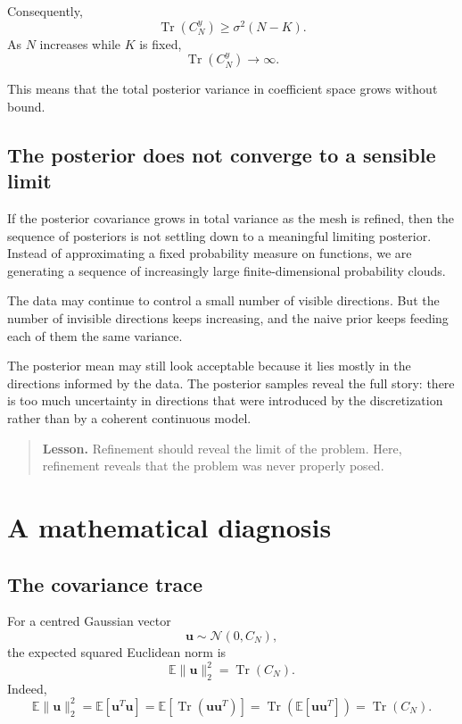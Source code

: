 \documentclass[11pt,a4paper]{book}
\newenvironment{lesson}
  {\begin{quote}\textbf{Lesson.}}
  {\end{quote}}
\begin{document}
Consequently,
\[
    \operatorname{Tr}(C_N^y)
    \geq
    \sigma^2 (N-K).
\]
As $N$ increases while $K$ is fixed,
\[
    \operatorname{Tr}(C_N^y)
    \to
    \infty.
\]

This means that the total posterior variance in coefficient space grows without
bound.

\subsection{The posterior does not converge to a sensible limit}

If the posterior covariance grows in total variance as the mesh is refined, then
the sequence of posteriors is not settling down to a meaningful limiting
posterior. Instead of approximating a fixed probability measure on functions, we
are generating a sequence of increasingly large finite-dimensional probability
clouds.

The data may continue to control a small number of visible directions. But the
number of invisible directions keeps increasing, and the naive prior keeps
feeding each of them the same variance.

The posterior mean may still look acceptable because it lies mostly in the
directions informed by the data. The posterior samples reveal the full story:
there is too much uncertainty in directions that were introduced by the
discretization rather than by a coherent continuous model.

\begin{lesson}
Refinement should reveal the limit of the problem.
Here, refinement reveals that the problem was never properly posed.
\end{lesson}

\section{A mathematical diagnosis}

\subsection{The covariance trace}

For a centred Gaussian vector
\[
    \bm{u} \sim \mathcal{N}(0,C_N),
\]
the expected squared Euclidean norm is
\[
    \mathbb{E}\|\bm{u}\|_2^2
    =
    \operatorname{Tr}(C_N).
\]
Indeed,
\[
    \mathbb{E}\|\bm{u}\|_2^2
    =
    \mathbb{E}[\bm{u}^T\bm{u}]
    =
    \mathbb{E}[\operatorname{Tr}(\bm{u}\bm{u}^T)]
    =
    \operatorname{Tr}(\mathbb{E}[\bm{u}\bm{u}^T])
    =
    \operatorname{Tr}(C_N).
\]
\end{document}
